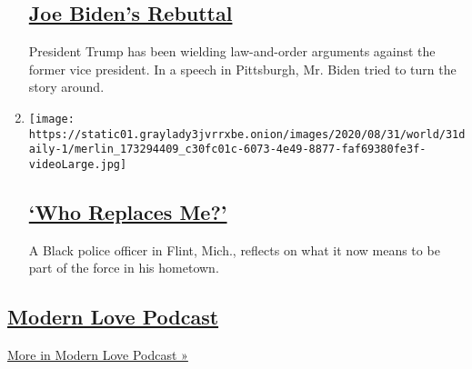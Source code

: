 \begin{enumerate}
  \hypertarget{joe-bidens-rebuttal}{%
  \subsection{\texorpdfstring{\href{/2020/09/01/podcasts/the-daily/joe-biden-protests-trump.html}{Joe
  Biden's Rebuttal}}{Joe Biden's Rebuttal}}\label{joe-bidens-rebuttal}}

  President Trump has been wielding law-and-order arguments against the
  former vice president. In a speech in Pittsburgh, Mr. Biden tried to
  turn the story around.
\item
  \texttt{[image: https://static01.graylady3jvrrxbe.onion/images/2020/08/31/world/31daily-1/merlin\_173294409\_c30fc01c-6073-4e49-8877-faf69380fe3f-videoLarge.jpg]}

  \hypertarget{who-replaces-me}{%
  \subsection{\texorpdfstring{\href{/2020/08/31/podcasts/the-daily/flint-michigan-police-officer.html}{`Who
  Replaces Me?'}}{`Who Replaces Me?'}}\label{who-replaces-me}}

  A Black police officer in Flint, Mich., reflects on what it now means
  to be part of the force in his hometown.
\end{enumerate}

\hypertarget{modern-love-podcast-1}{%
\subsection{\texorpdfstring{\href{/column/modern-love-podcast}{Modern
Love Podcast}}{Modern Love Podcast}}\label{modern-love-podcast-1}}

\href{/column/modern-love-podcast}{More in Modern Love Podcast »}

